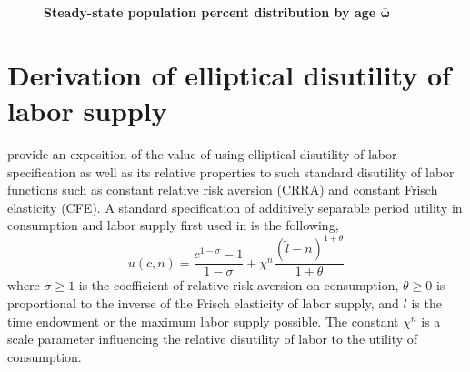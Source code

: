 \documentclass[letterpaper,12pt]{article}
\theoremstyle{definition}
\begin{document}
  \begin{figure}[htbp]\centering \captionsetup{width=4.0in}
    \caption{\label{FigSSpopdist}\textbf{Steady-state population percent distribution by age $\bm{\bar{\omega}}$}}
  \end{figure}
  \clearpage



\newpage
\section{Derivation of elliptical disutility of labor supply}\label{AppEllipseUtil}

  \setcounter{equation}{0}

  \citet{EvanPhillips:2015} provide an exposition of the value of using elliptical disutility of labor specification as well as its relative properties to such standard disutility of labor functions such as constant relative risk aversion (CRRA) and constant Frisch elasticity (CFE). A standard specification of additively separable period utility in consumption and labor supply first used in \citet{KPR:1988} is the following,
  \begin{equation}\label{AppEqStandUtil}
    u(c,n) = \frac{c^{1-\sigma} - 1}{1-\sigma} + \chi^n\frac{\left(\tilde{l} - n\right)^{1+\theta}}{1+\theta}
  \end{equation}
  where $\sigma\geq 1$ is the coefficient of relative risk aversion on consumption, $\theta\geq 0$ is proportional to the inverse of the Frisch elasticity of labor supply, and $\tilde{l}$ is the time endowment or the maximum labor supply possible. The constant $\chi^n$ is a scale parameter influencing the relative disutility of labor to the utility of consumption.
\end{document}
